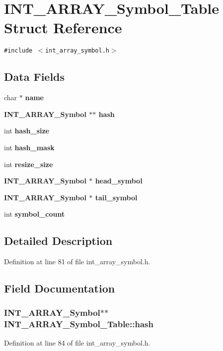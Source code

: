 \section{INT\_\-ARRAY\_\-Symbol\_\-Table Struct Reference}
\label{structINT__ARRAY__Symbol__Table}
{\tt \#include $<$int\_\-array\_\-symbol.h$>$}

\subsection*{Data Fields}
\begin{CompactItemize}
\item 
char $\ast$ \bf{name}
\item 
\bf{INT\_\-ARRAY\_\-Symbol} $\ast$$\ast$ \bf{hash}
\item 
int \bf{hash\_\-size}
\item 
int \bf{hash\_\-mask}
\item 
int \bf{resize\_\-size}
\item 
\bf{INT\_\-ARRAY\_\-Symbol} $\ast$ \bf{head\_\-symbol}
\item 
\bf{INT\_\-ARRAY\_\-Symbol} $\ast$ \bf{tail\_\-symbol}
\item 
int \bf{symbol\_\-count}
\end{CompactItemize}


\subsection{Detailed Description}




Definition at line 81 of file int\_\-array\_\-symbol.h.

\subsection{Field Documentation}
\subsubsection{\setlength{\rightskip}{0pt plus 5cm}\bf{INT\_\-ARRAY\_\-Symbol}$\ast$$\ast$ \bf{INT\_\-ARRAY\_\-Symbol\_\-Table::hash}}\label{structINT__ARRAY__Symbol__Table_b47dca5685e3a21ca1c4e664888b0c45}




Definition at line 84 of file int\_\-array\_\-symbol.h.

